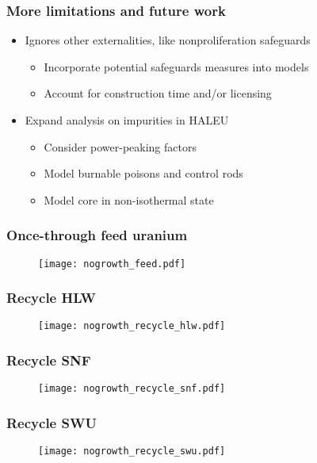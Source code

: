 \begin{frame}
    \frametitle{More limitations and future work}
    \begin{itemize}
    \item Ignores other externalities, like nonproliferation
        safeguards
    \begin{itemize}
        \item Incorporate potential safeguards measures into models
        \item Account for construction time and/or licensing
    \end{itemize}
    \item Expand analysis on impurities in \gls{HALEU}
    \begin{itemize}
        \item Consider power-peaking factors
        \item Model burnable poisons and control rods 
        \item Model core in non-isothermal state
    \end{itemize}
\end{itemize}
\end{frame}

\begin{frame}
    \frametitle{Once-through feed uranium}
    \begin{figure}
        \centering 
        \texttt{[image: nogrowth\_feed.pdf]}
    \end{figure}
\end{frame}

\begin{frame}
    \frametitle{Recycle HLW}
    \begin{figure}
        \centering
        \texttt{[image: nogrowth\_recycle\_hlw.pdf]}
    \end{figure}
\end{frame}

\begin{frame}
    \frametitle{Recycle SNF}
    \begin{figure}
        \centering
        \texttt{[image: nogrowth\_recycle\_snf.pdf]}
    \end{figure}
\end{frame}

\begin{frame}
    \frametitle{Recycle SWU}
    \begin{figure}
        \centering
        \texttt{[image: nogrowth\_recycle\_swu.pdf]}
    \end{figure}
\end{frame}

